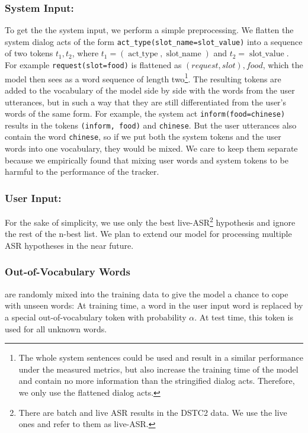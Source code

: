 \documentclass[10pt,twocolumn]{article}
\begin{document}
\subsubsection{System Input:}
To get the the system input, we perform a simple preprocessing. We flatten the system dialog acts of the form \texttt{act\_type(slot\_name=slot\_value)} into a sequence of two tokens $t_1, t_2$, where $t_1=(\operatorname{act\_type}, \operatorname{slot\_name})$ and $t_2=\operatorname{slot\_value}$. For example \texttt{request(slot=food)} is flattened as $(request, slot), food$, which the model then sees as a word sequence of length two\footnote{The whole system sentences could be used and result in a similar performance under the measured metrics, but also increase the training time of the model and contain no more information than the stringified dialog acts. Therefore, we only use the flattened dialog acts.}. The resulting tokens are added to the vocabulary of the model side by side with the words from the user utterances, but in such a way that they are still differentiated from the user's words of the same form. For example, the system act \texttt{inform(food=chinese)} results in the tokens \texttt{(inform, food)} and \texttt{chinese}. But the user utterances also contain the word \texttt{chinese}, so if we put both the system tokens and the user words into one vocabulary, they would be mixed. We care to keep them separate because we empirically found that mixing user words and system tokens to be harmful to the performance of the tracker.

\subsubsection{User Input:}
For the sake of simplicity, we use only the best live-ASR\footnote{There are batch and live ASR results in the DSTC2 data. We use the live ones and refer to them as live-ASR.} hypothesis and ignore the rest of the n-best list.
We plan to extend our model for processing multiple ASR hypotheses in the near future.

\subsubsection{Out-of-Vocabulary Words}
are randomly mixed into the training data to give the model a chance to cope with unseen words: At training time, a word in the user input word is replaced by a special out-of-vocabulary token with probability $\alpha$. At test time, this token is used for all unknown words.
\end{document}

